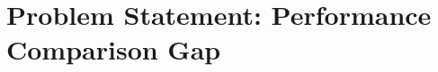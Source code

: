 \documentclass{erauthesis}
\begin{document}
\section{Problem Statement: Performance Comparison Gap} \label{problem_statement1}


\end{document}
